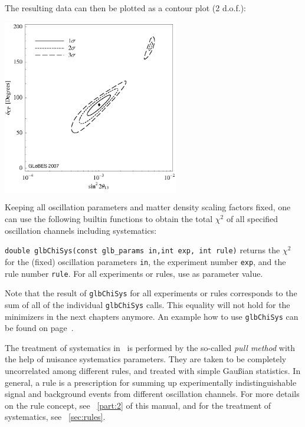 {The resulting data can then be plotted as a contour plot (2 d.o.f.):
\begin{center}
\colorbox{white}{\includegraphics[width=7.7cm]{correx}}
\end{center}

}

Keeping all oscillation parameters and matter density scaling factors fixed,
 one can use the following builtin functions to obtain the total $\chi^2$ of all 
 specified oscillation channels including systematics:
\begin{function} 
{\tt double glbChiSys(const glb\_params in,int exp, int rule)} returns
the $\chi^2$ for the (fixed) oscillation parameters {\tt in}, the
experiment number {\tt exp}, and the rule number {\tt rule}. For all
experiments or rules, use  as parameter value.
\end{function}
Note that the result of {\tt glbChiSys} for all experiments or rules
corresponds to the sum of all of the individual {\tt glbChiSys} calls. 
This equality will not hold for the minimizers in the next chapters anymore. 
 An example how to use  {\tt glbChiSys} can be found on page~\pageref{ex:corrth13dcp}.  

 
The treatment of systematics in \GLOBES\ is performed by the so-called
{\em pull method} with the help of nuisance systematics parameters.
They are taken to be completely uncorrelated among different rules,
and treated with simple Gau\ss ian statistics.
In general, a rule is a prescription for summing up experimentally indistinguishable
signal and background events from different oscillation channels.
For more details on the rule concept, see \Part~\ref{part:2} of this manual,
and for the treatment of systematics, see \Sec~\ref{sec:rules}.
 
